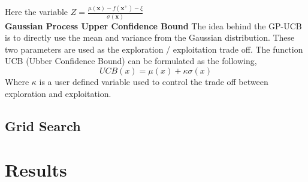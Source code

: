 \documentclass[12pt,fleqn]{article}
\begin{document}
Here the variable $ Z = \frac{\mu(\mathbf{x}) - f(\mathbf{x}^+) - \xi }{\sigma(\mathbf{x})} $ \newline 
\\
\textbf{Gaussian Process Upper Confidence Bound} \newline
The idea behind the GP-UCB is to directly use the mean and variance from the Gaussian distribution. These two parameters are used as the exploration / exploitation trade off. The function UCB (Ubber Confidence Bound) can be formulated as the following, 
\begin{equation*}
UCB(x) = \mu(x) + \kappa \sigma(x)
\end{equation*}
\noindent
Where $ \kappa $ is a user defined variable used to control the trade off between exploration and exploitation. \newline

\subsection*{Grid Search}

\section{Results}
\end{document}

